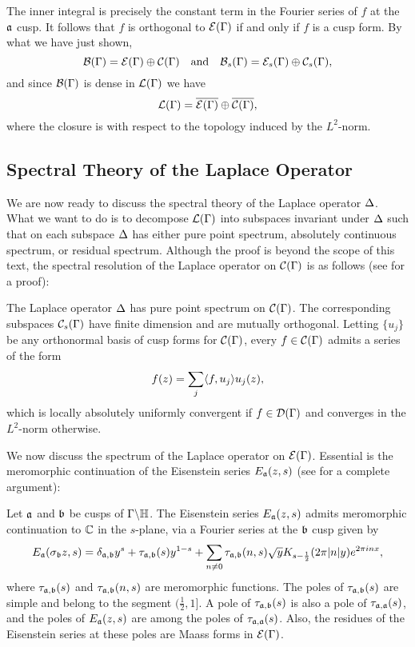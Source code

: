       The inner integral is precisely the constant term in the Fourier series of $f$ at the $\mathfrak{a}$ cusp. It follows that $f$ is orthogonal to $\mathcal{E}(\Gamma)$ if and only if $f$ is a cusp form. By what we have just shown,
      \[
        \mathcal{B}(\Gamma) = \mathcal{E}(\Gamma) \oplus \mathcal{C}(\Gamma) \quad \text{and} \quad \mathcal{B}_{s}(\Gamma) = \mathcal{E}_{s}(\Gamma) \oplus \mathcal{C}_{s}(\Gamma),
      \]
      and since $\mathcal{B}(\Gamma)$ is dense in $\mathcal{L}(\Gamma)$ we have
      \[
        \mathcal{L}(\Gamma) = \overline{\mathcal{E}(\Gamma)} \oplus \overline{\mathcal{C}(\Gamma)},
      \]
      where the closure is with respect to the topology induced by the $L^{2}$-norm.
    \subsection*{Spectral Theory of the Laplace Operator}
      We are now ready to discuss the spectral theory of the Laplace operator $\Delta$. What we want to do is to decompose $\mathcal{L}(\Gamma)$ into subspaces invariant under $\Delta$ such that on each subspace $\Delta$ has either pure point spectrum, absolutely continuous spectrum, or residual spectrum. Although the proof is beyond the scope of this text, the spectral resolution of the Laplace operator on $\mathcal{C}(\Gamma)$ is as follows (see \cite{iwaniec2002spectral} for a proof):

      \begin{theorem}\label{thm:cusp_form_spectrum}
        The Laplace operator $\Delta$ has pure point spectrum on $\mathcal{C}(\Gamma)$. The corresponding subspaces $\mathcal{C}_{s}(\Gamma)$ have finite dimension and are mutually orthogonal. Letting $\{u_{j}\}$ be any orthonormal basis of cusp forms for $\mathcal{C}(\Gamma)$, every $f \in \mathcal{C}(\Gamma)$ admits a series of the form
        \[
          f(z) = \sum_{j}\langle f,u_{j}\rangle u_{j}(z),
        \]
        which is locally absolutely uniformly convergent if $f \in \mathcal{D}(\Gamma)$ and converges in the $L^{2}$-norm otherwise.
      \end{theorem}

      We now discuss the spectrum of the Laplace operator on $\mathcal{E}(\Gamma)$. Essential is the meromorphic continuation of the Eisenstein series $E_{\mathfrak{a}}(z,s)$ (see \cite{iwaniec2002spectral} for a complete argument):

      \begin{theorem}\label{thm:meromorphic_continuation_of_Eisenstein_series}
        Let $\mathfrak{a}$ and $\mathfrak{b}$ be cusps of $\Gamma\backslash\mathbb{H}$. The Eisenstein series $E_{\mathfrak{a}}(z,s)$ admits meromorphic continuation to $\mathbb{C}$ in the $s$-plane, via a Fourier series at the $\mathfrak{b}$ cusp given by
        \[
          E_{\mathfrak{a}}(\sigma_{\mathfrak{b}}z,s) = \delta_{\mathfrak{a},\mathfrak{b}}y^{s}+\tau_{\mathfrak{a},\mathfrak{b}}(s)y^{1-s}+\sum_{n \neq 0}\tau_{\mathfrak{a},\mathfrak{b}}(n,s)\sqrt{y}K_{s-\frac{1}{2}}(2\pi|n|y)e^{2\pi inx},
        \]
        where $\tau_{\mathfrak{a},\mathfrak{b}}(s)$ and $\tau_{\mathfrak{a},\mathfrak{b}}(n,s)$ are meromorphic functions. The poles of $\tau_{\mathfrak{a},\mathfrak{b}}(s)$ are simple and belong to the segment $(\frac{1}{2},1]$. A pole of $\tau_{\mathfrak{a},\mathfrak{b}}(s)$ is also a pole of $\tau_{\mathfrak{a},\mathfrak{a}}(s)$, and the poles of $E_{\mathfrak{a}}(z,s)$ are among the poles of $\tau_{\mathfrak{a},\mathfrak{a}}(s)$. Also, the residues of the Eisenstein series at these poles are Maass forms in $\mathcal{E}(\Gamma)$.
      \end{theorem}

